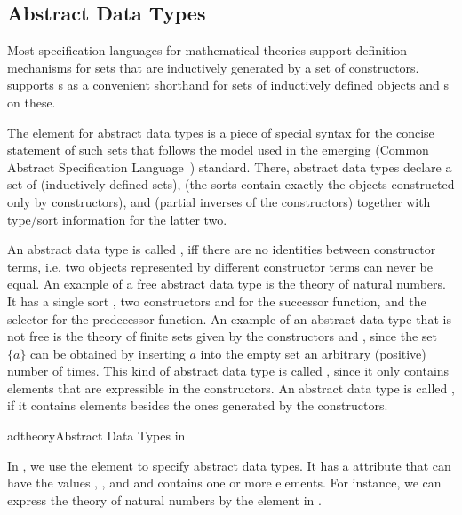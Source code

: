 \subsection{Abstract Data Types}\label{sec:adt}

Most specification languages for mathematical theories support definition
mechanisms for sets that are inductively generated by a set of constructors.
{\omdoc} supports {s} as a
convenient shorthand for sets of inductively defined objects and
{s} on these.

The {} element for abstract data types is a piece of special syntax for
the concise statement of such sets that follows the model used in the emerging
{\casl} (Common Abstract Specification Language~\cite{CoFI98}) standard.  There,
abstract data types declare a set of {} (inductively defined sets),
{} (the sorts contain exactly the objects constructed only by
constructors), and {} (partial inverses of the constructors)
together with type/sort information for the latter two. 

An abstract data type is called {}, iff there are no identities
between constructor terms, i.e.  two objects represented by different constructor
terms can never be equal. An example of a free abstract data type is the theory of
natural numbers. It has a single sort {}, two constructors {}
and {} for the successor function, and the selector {} for
the predecessor function. An example of an abstract data type that is not free is
the theory of finite sets given by the constructors {} and
{}, since the set $\{a\}$ can be obtained by inserting $a$ into the
empty set an arbitrary (positive) number of times. This kind of abstract data type
is called {}, since it only contains elements that are
expressible in the constructors. An abstract data type is called {},
if it contains elements besides the ones generated by the constructors.

\begin{myfig}{adtheory}{Abstract Data Types in {\omdoc}}
  \quicktable{\adttable{}}
\end{myfig}

In {\omdoc}, we use the {} element to specify abstract data types. It
has a {} attribute that can have the values
{}, {}, and
{} and contains one or more {} elements.
For instance, we can express the theory of natural numbers by the {}
element in {}.

